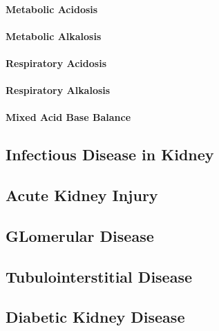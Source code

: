 \documentclass[
  letterpaper,
  DIV=11,
  numbers=noendperiod]{scrreprt}
\let\oldparagraph\paragraph
\renewcommand{\paragraph}[1]{\oldparagraph{#1}\mbox{}}
\begin{document}
\paragraph{Metabolic Acidosis}\label{metabolic-acidosis}

\paragraph{Metabolic Alkalosis}\label{metabolic-alkalosis}

\paragraph{Respiratory Acidosis}\label{respiratory-acidosis}

\paragraph{Respiratory Alkalosis}\label{respiratory-alkalosis}

\paragraph{Mixed Acid Base Balance}\label{mixed-acid-base-balance}

\subsection{Infectious Disease in
Kidney}\label{infectious-disease-in-kidney}

\subsection{Acute Kidney Injury}\label{acute-kidney-injury}

\subsection{GLomerular Disease}\label{glomerular-disease}

\subsection{Tubulointerstitial
Disease}\label{tubulointerstitial-disease}

\subsection{Diabetic Kidney Disease}\label{diabetic-kidney-disease}
\end{document}
